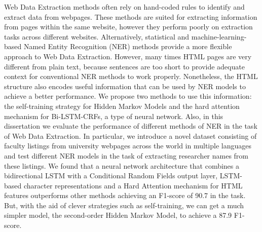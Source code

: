 Web Data Extraction methods often rely on hand-coded rules to 
identify and extract data from webpages. These methods are
suited for extracting information from pages within
the same website, however they perform poorly on extraction 
tasks across different websites. Alternatively, statistical and 
machine-learning-based Named Entity Recognition (NER) methods provide a more flexible 
approach to Web Data Extraction. However, many times HTML pages are very different 
from plain text, because sentences are too short to provide adequate 
context for conventional NER methods to work 
properly. Nonetheless, the HTML structure also encodes useful information that 
can be used by NER models to achieve a better performance. We propose two
methods to use this information: the self-training strategy for Hidden Markov
Models and the hard attention mechanism for Bi-LSTM-CRFs, a type of neural network.
Also, in this dissertation we 
evaluate the performance of different methods of NER
in the task of Web Data Extraction. In particular, we introduce a novel 
dataset consisting of faculty listings from university webpages across
the world in multiple languages and test different NER models in the task of 
extracting researcher names from these listings. We found that a 
neural network architecture that combines a bidirectional LSTM with
a Conditional Random Fields output layer, LSTM-based character 
representations and a Hard Attention mechanism for HTML features
outperforms other methods achieving an F1-score of 90.7 in the task.
But, with the aid of clever strategies such as self-training, we can get a 
much simpler model, the second-order Hidden Markov Model, 
to achieve a 87.9 F1-score.


